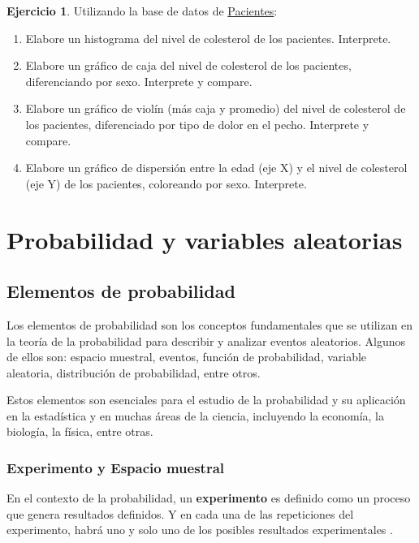 \documentclass[
  11pt,
]{book}
\providecommand{\tightlist}{%
  \setlength{\itemsep}{0pt}\setlength{\parskip}{0pt}}
\theoremstyle{definition}
\theoremstyle{definition}
\theoremstyle{definition}
\newtheorem{exercise}{Ejercicio}[chapter]
\theoremstyle{definition}
\theoremstyle{remark}
\begin{document}
\begin{exercise}

Utilizando la base de datos de \hyperref[Pacientes]{Pacientes}:

\begin{enumerate}
\def\labelenumi{\arabic{enumi}.}
\tightlist
\item
  Elabore un histograma del nivel de colesterol de los pacientes. Interprete.
\item
  Elabore un gráfico de caja del nivel de colesterol de los pacientes, diferenciando por sexo. Interprete y compare.
\item
  Elabore un gráfico de violín (más caja y promedio) del nivel de colesterol de los pacientes, diferenciado por tipo de dolor en el pecho. Interprete y compare.
\item
  Elabore un gráfico de dispersión entre la edad (eje X) y el nivel de colesterol (eje Y) de los pacientes, coloreando por sexo. Interprete.
\end{enumerate}

\end{exercise}

\chapter{Probabilidad y variables aleatorias}\label{probabilidad-y-variables-aleatorias}

\section{Elementos de probabilidad}\label{elementos-de-probabilidad}

Los elementos de probabilidad son los conceptos fundamentales que se utilizan en la teoría de la probabilidad para describir y analizar eventos aleatorios. Algunos de ellos son: espacio muestral, eventos, función de probabilidad, variable aleatoria, distribución de probabilidad, entre otros.

Estos elementos son esenciales para el estudio de la probabilidad y su aplicación en la estadística y en muchas áreas de la ciencia, incluyendo la economía, la biología, la física, entre otras.

\subsection{Experimento y Espacio muestral}\label{experimento-y-espacio-muestral}

En el contexto de la probabilidad, un \textbf{experimento} es definido como un proceso que genera resultados definidos. Y en cada una de las repeticiones del experimento, habrá uno y solo uno de los posibles resultados experimentales \citep[página 143]{anderson}.
\end{document}

